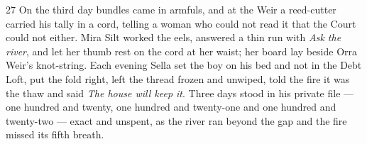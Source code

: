 \begin{CRchronicle}{27}
On the third day bundles came in armfuls, and at the Weir a reed-cutter carried his tally in a cord, telling a woman who could not read it that the Court could not either. Mira Silt worked the eels, answered a thin run with \emph{Ask the river}, and let her thumb rest on the cord at her waist; her board lay beside Orra Weir’s knot-string. Each evening Sella set the boy on his bed and not in the Debt Loft, put the fold right, left the thread frozen and unwiped, told the fire it was the thaw and said \emph{The house will keep it}. Three days stood in his private file --- one hundred and twenty, one hundred and twenty-one and one hundred and twenty-two --- exact and unspent, as the river ran beyond the gap and the fire missed its fifth breath.
\end{CRchronicle}
